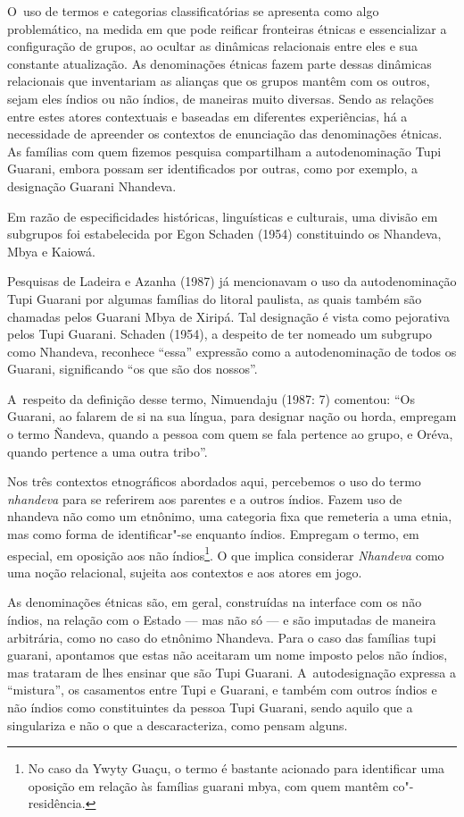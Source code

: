 O~uso de termos e categorias classificatórias se apresenta como algo
problemático, na medida em que pode reificar fronteiras étnicas e
essencializar a configuração de grupos, ao ocultar as dinâmicas
relacionais entre eles e sua constante atualização. As denominações
étnicas fazem parte dessas dinâmicas relacionais que inventariam as
alianças que os grupos mantêm com os outros, sejam eles índios ou não
índios, de maneiras muito diversas. Sendo as relações entre estes
atores contextuais e baseadas em diferentes experiências, há a
necessidade de apreender os contextos de enunciação das denominações
étnicas. As famílias com quem fizemos pesquisa compartilham a
autodenominação Tupi Guarani, embora possam ser identificados por
outras, como por exemplo, a designação Guarani Nhandeva.

Em razão de especificidades históricas, linguísticas e culturais, uma
divisão em subgrupos foi estabelecida por Egon Schaden (1954)
constituindo os Nhandeva, Mbya e Kaiowá.

Pesquisas de Ladeira e Azanha (1987) já mencionavam o uso da
autodenominação Tupi Guarani por algumas famílias do litoral paulista,
as quais também são chamadas pelos Guarani Mbya de Xiripá. Tal
designação é vista como pejorativa pelos Tupi Guarani. Schaden (1954),
a despeito de ter nomeado um subgrupo como Nhandeva, reconhece ``essa''
expressão como a autodenominação de todos os Guarani, significando ``os
que são dos nossos''.

A~respeito da definição desse termo, Nimuendaju (1987: 7) comentou: ``Os
Guarani, ao falarem de si na sua língua, para designar nação ou horda,
empregam o termo Ñandeva, quando a pessoa com quem se fala pertence ao
grupo, e Oréva, quando pertence a uma outra tribo''.

Nos três contextos etnográficos abordados aqui, percebemos o uso do
termo \emph{nhandeva} para se referirem aos parentes e a outros índios. Fazem
uso de nhandeva não como um etnônimo, uma categoria fixa que remeteria
a uma etnia, mas como forma de identificar"-se enquanto índios. Empregam
o termo, em especial, em oposição aos não índios\footnote{No caso da
Ywyty Guaçu, o termo é bastante acionado para identificar uma oposição
em relação às famílias guarani mbya, com quem mantêm co"-residência.}. O
que implica considerar \emph{Nhandeva} como uma noção relacional, sujeita aos
contextos e aos atores em jogo.

As denominações étnicas são, em geral, construídas na interface com os
não índios, na relação com o Estado --- mas não só --- e são imputadas de
maneira arbitrária, como no caso do etnônimo Nhandeva. Para o caso das
famílias tupi guarani, apontamos que estas não aceitaram um nome
imposto pelos não índios, mas trataram de lhes ensinar que são Tupi
Guarani. A~autodesignação expressa a ``mistura'', os casamentos entre Tupi
e Guarani, e também com outros índios e não índios como constituintes
da pessoa Tupi Guarani, sendo aquilo que a singulariza e não o que a
descaracteriza, como pensam alguns.

